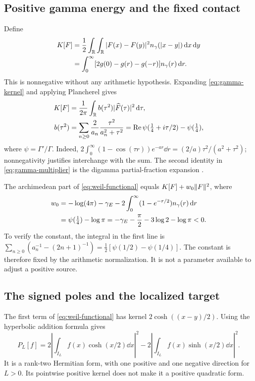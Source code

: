 \subsection{Positive gamma energy and the fixed contact}
Define
\begin{align}
 K[F]&=\frac12\int_\mathbb R\int_\mathbb R
    |F(x)-F(y)|^2n_{\gamma}(|x-y|)\,\mathrm d x\,\mathrm d y\notag\\
 &=\int_0^\infty[2g(0)-g(r)-g(-r)]n_{\gamma}(r)\,\mathrm d r.
 \label{eq:gamma-energy}
\end{align}
This is nonnegative without any arithmetic hypothesis. Expanding
\eqref{eq:gamma-kernel} and applying Plancherel gives
\begin{align}
 K[F]&=\frac1{2\pi}\int_\mathbb R b(\tau^2)|\widehat F(\tau)|^2\,\mathrm d\tau,
 \label{eq:gamma-fourier}\\
 b(\tau^2)&=\sum_{n\geq0}\frac2{a_n}
                 \frac{\tau^2}{a_n^2+\tau^2}
 =\operatorname{Re}\psi(\tfrac14+i\tau/2)-\psi(\tfrac14),
 \label{eq:gamma-multiplier}
\end{align}
where $\psi=\Gamma'/\Gamma$. Indeed,
$2\int_0^\infty(1-\cos(\tau r))e^{-ar}\dd r
=(2/a)\tau^2/(a^2+\tau^2)$; nonnegativity justifies interchange with
the sum. The second identity in \eqref{eq:gamma-multiplier} is the
digamma partial-fraction expansion \cite{DLMF}.

The archimedean part of \eqref{eq:weil-functional} equals
$K[F]+w_0\lVert F\rVert^2$, where
\begin{align}
 w_0&= -\log(4\pi)-\gamma_E
       -2\int_0^\infty(1-e^{-r/2})n_{\gamma}(r)\,\mathrm d r\notag\\
 &=\psi(\tfrac14)-\log\pi
 =-\gamma_E-\frac\pi2-3\log2-\log\pi<0.
 \label{eq:contact}
\end{align}
To verify the constant, the integral in the first line is
$\sum_{n\geq0}(a_n^{-1}-(2n+1)^{-1})
=\tfrac12[\psi(1/2)-\psi(1/4)]$.
The constant is therefore fixed by the arithmetic normalization.
It is not a parameter available to adjust a positive source.

\subsection{The signed poles and the localized target}
The first term of \eqref{eq:weil-functional} has kernel
$2\cosh((x-y)/2)$. Using the hyperbolic addition formula gives
\begin{equation}\label{eq:poles}
 P_L[f]=2\left|\int_{I_L}f(x)\cosh(x/2)\dd x\right|^2
       -2\left|\int_{I_L}f(x)\sinh(x/2)\dd x\right|^2.
\end{equation}
It is a rank-two Hermitian form, with one positive and one negative
direction for $L>0$. Its pointwise positive kernel does not make it a
positive quadratic form.

